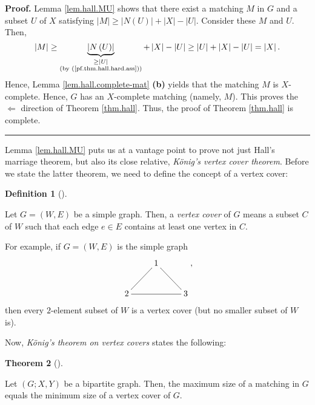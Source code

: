 \documentclass[numbers=enddot,12pt,final,onecolumn,notitlepage]{scrartcl}%
\makeatletter
\theoremstyle{definition}
\newtheorem{theo}{Theorem}[section]
\newenvironment{theorem}[1][]
{\begin{theo}[#1]\begin{leftbar}}
{\end{leftbar}\end{theo}}
\newtheorem{defi}[theo]{Definition}
\newenvironment{definition}[1][]
{\begin{defi}[#1]\begin{leftbar}}
{\end{leftbar}\end{defi}}
\newenvironment{proof}[1][Proof]{\noindent\textbf{#1.} }{\ \rule{0.5em}{0.5em}}
\newcommand{\are}{\ar@{-}}
\makeatother
\begin{document}
\begin{proof}
Lemma \ref{lem.hall.MU} shows that there exist a matching $M$ in $G$ and a
subset $U$ of $X$ satisfying $\left\vert M\right\vert \geq\left\vert N\left(
U\right)  \right\vert +\left\vert X\right\vert -\left\vert U\right\vert $.
Consider these $M$ and $U$. Then,%
\[
\left\vert M\right\vert \geq\underbrace{\left\vert N\left(  U\right)
\right\vert }_{\substack{\geq\left\vert U\right\vert \\\text{(by
(\ref{pf.thm.hall.hard.ass}))}}}+\left\vert X\right\vert -\left\vert
U\right\vert \geq\left\vert U\right\vert +\left\vert X\right\vert -\left\vert
U\right\vert =\left\vert X\right\vert .
\]
Hence, Lemma \ref{lem.hall.complete-mat} \textbf{(b)} yields that the matching
$M$ is $X$-complete. Hence, $G$ has an $X$-complete matching (namely, $M$).
This proves the $\Longleftarrow$ direction of Theorem \ref{thm.hall}. Thus,
the proof of Theorem \ref{thm.hall} is complete.
\end{proof}

Lemma \ref{lem.hall.MU} puts us at a vantage point to prove not just Hall's
marriage theorem, but also its close relative, \textit{K\"{o}nig's vertex
cover theorem}. Before we state the latter theorem, we need to define the
concept of a vertex cover:

\begin{definition}
Let $G=\left(  W,E\right)  $ be a simple graph. Then, a \textit{vertex cover}
of $G$ means a subset $C$ of $W$ such that each edge $e\in E$ contains at
least one vertex in $C$.
\end{definition}

For example, if $G=\left(  W,E\right)  $ is the simple graph%
\begin{equation}%
\xymatrix{
& 1 \are[dl] \are[dr] \\
2 \are[rr] & & 3
}%
, \label{eq.hall.vertexcover.ex1}%
\end{equation}
then every $2$-element subset of $W$ is a vertex cover (but no smaller subset
of $W$ is).

Now, \textit{K\"{o}nig's theorem on vertex covers} states the following:

\begin{theorem}
\label{thm.hall.koenig}Let $\left(  G;X,Y\right)  $ be a bipartite graph.
Then, the maximum size of a matching in $G$ equals the minimum size of a
vertex cover of $G$.
\end{theorem}
\end{document}
